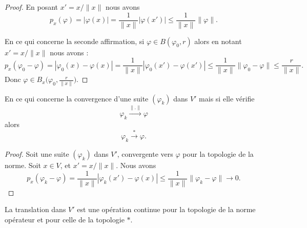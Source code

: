 \begin{proof}
    En posant \( x'=x/\| x \|\) nous avons
    \begin{equation}
        p_x(\varphi)=| \varphi(x) |=\frac{1}{ \| x \| }| \varphi(x') |\leq \frac{1}{ \| x \| }\| \varphi \|.
    \end{equation}

    En ce qui concerne la seconde affirmation, si \( \varphi\in B(\varphi_0,r)\) alors en notant \( x'=x/\| x \|\) nous avons :
    \begin{equation}
        p_x(\varphi_0-\varphi)=| \varphi_0(x)-\varphi(x) |=\frac{1}{ \| x \| }| \varphi_0(x')-\varphi(x') |\leq\frac{1}{ \| x \| }\|\varphi_0-\varphi  \|\leq \frac{ r }{ \| x \| }.
    \end{equation}
    Donc \( \varphi\in B_x\big( \varphi_0,\frac{ r }{ \| x \| } \big)\).
\end{proof}

\begin{proposition}
    En ce qui concerne la convergence d'une suite \( (\varphi_k)\) dans \( V'\) mais si elle vérifie
    \begin{equation}
        \varphi_k\stackrel{\| . \|}{\longrightarrow}\varphi
    \end{equation}
    alors
    \begin{equation}
        \varphi_k\stackrel{*}{\longrightarrow}\varphi.
    \end{equation}
\end{proposition}

\begin{proof}
    Soit une suite \( (\varphi_k)\) dans \( V'\), convergente vers \( \varphi\) pour la topologie de la norme.  Soit \( x\in V\), et \( x'=x/\| x \|\). Nous avons
    \begin{equation}
        p_x(\varphi_k-\varphi)=\frac{1}{ \| x \| }| \varphi_k(x')-\varphi(x) |\leq\frac{1}{ \| x \| }\| \varphi_k-\varphi \|\to 0.
    \end{equation}
\end{proof}

\begin{lemma}       \label{LEMooEAVEooAFveHn}
    La translation dans \( V'\) est une opération continue pour la topologie de la norme opérateur et pour celle de la topologie \( *\).
\end{lemma}

